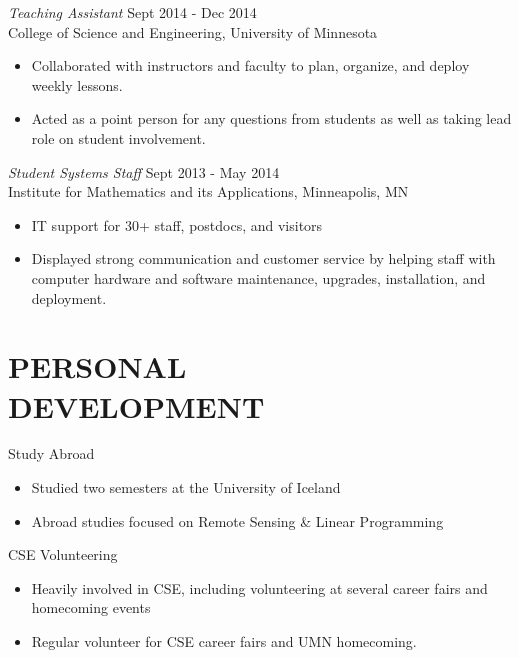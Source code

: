 \documentclass[margin]{res}
\begin{document}
\begin{resume}
                {\sl Teaching Assistant} \hfill Sept 2014 - Dec 2014 \\
                College of Science and Engineering, University of Minnesota
                 \begin{itemize}  \itemsep -2pt %
                 \item Collaborated with instructors and faculty to plan, organize, and deploy weekly lessons.
                 \item Acted as a point person for any questions from students as well as taking lead role on student involvement.
                 \end{itemize}

                {\sl Student Systems Staff} \hfill   Sept 2013 - May 2014 \\
                Institute for Mathematics and its Applications, Minneapolis, MN
                  \begin{itemize}
                   \item IT support for 30+ staff, postdocs, and visitors
                   \item Displayed strong communication and customer service by helping staff with computer hardware and software maintenance, upgrades, installation, and deployment.
                   \end{itemize}

\section{PERSONAL \\ DEVELOPMENT}
                Study Abroad
                \begin{itemize}
                  \item Studied two semesters at the University of Iceland
                  \item Abroad studies focused on Remote Sensing \& Linear Programming
                \end{itemize}

                CSE Volunteering
                \begin{itemize}
                  \item Heavily involved in CSE, including volunteering at several career fairs and homecoming events
                  \item Regular volunteer for CSE career fairs and UMN homecoming.
                \end{itemize}

\end{resume}
\end{document}

